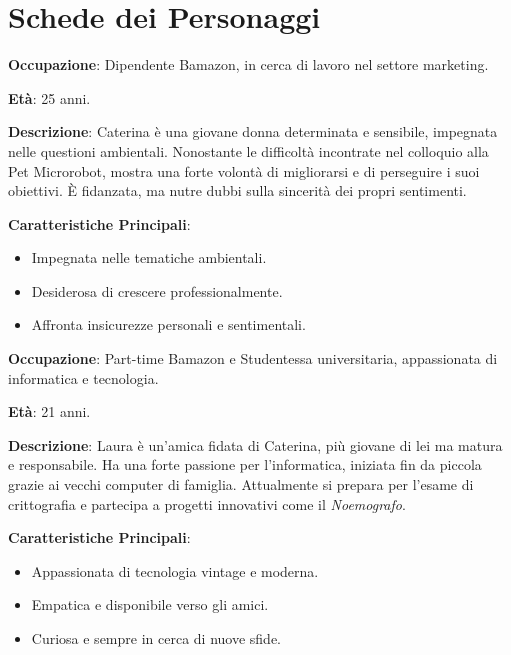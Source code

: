 
\section*{Schede dei Personaggi}

\begin{tcolorbox}[colback=white,colframe=black,title=\textbf{Caterina}]
\begin{multicols}{2}
\textbf{Occupazione}: Dipendente Bamazon, in cerca di lavoro nel settore marketing.

\textbf{Età}: 25 anni.

\textbf{Descrizione}: Caterina è una giovane donna determinata e sensibile, impegnata nelle questioni ambientali. Nonostante le difficoltà incontrate nel colloquio alla Pet Microrobot, mostra una forte volontà di migliorarsi e di perseguire i suoi obiettivi. È fidanzata, ma nutre dubbi sulla sincerità dei propri sentimenti.

\textbf{Caratteristiche Principali}:
\begin{itemize}
    \item Impegnata nelle tematiche ambientali.
    \item Desiderosa di crescere professionalmente.
    \item Affronta insicurezze personali e sentimentali.
\end{itemize}
\end{multicols}
\end{tcolorbox}

\vspace{0.5cm}

\begin{tcolorbox}[colback=white,colframe=black,title=\textbf{Laura}]
\begin{multicols}{2}
\textbf{Occupazione}: Part-time Bamazon e Studentessa universitaria, appassionata di informatica e tecnologia.

\textbf{Età}: 21 anni.

\textbf{Descrizione}: Laura è un'amica fidata di Caterina, più giovane di lei ma matura e responsabile. Ha una forte passione per l'informatica, iniziata fin da piccola grazie ai vecchi computer di famiglia. Attualmente si prepara per l'esame di crittografia e partecipa a progetti innovativi come il \emph{Noemografo}.

\textbf{Caratteristiche Principali}:
\begin{itemize}
    \item Appassionata di tecnologia vintage e moderna.
    \item Empatica e disponibile verso gli amici.
    \item Curiosa e sempre in cerca di nuove sfide.
\end{itemize}
\end{multicols}
\end{tcolorbox}

